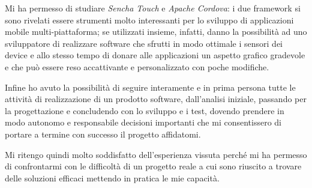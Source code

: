 Mi ha permesso di studiare \emph{Sencha Touch} e \emph{Apache Cordova}: i due framework si sono rivelati essere strumenti molto interessanti per lo sviluppo di applicazioni mobile multi-piattaforma; se utilizzati insieme, infatti, danno la possibilità ad uno sviluppatore di realizzare software che sfrutti in modo ottimale i sensori dei device e allo stesso tempo  di donare alle applicazioni un aspetto grafico gradevole e che può essere reso accattivante e personalizzato con poche modifiche.

Infine ho avuto la possibilità di seguire interamente e in prima persona tutte le attività di realizzazione di un prodotto software, dall'analisi iniziale, passando per la progettazione e concludendo con lo sviluppo e i test, dovendo prendere in modo autonomo e responsabile decisioni importanti che mi consentissero di portare a termine con successo il progetto affidatomi.

Mi ritengo quindi molto soddisfatto dell'esperienza vissuta perché mi ha permesso di confrontarmi con le difficoltà di un progetto reale a cui sono riuscito a trovare delle soluzioni efficaci mettendo in pratica le mie capacità.